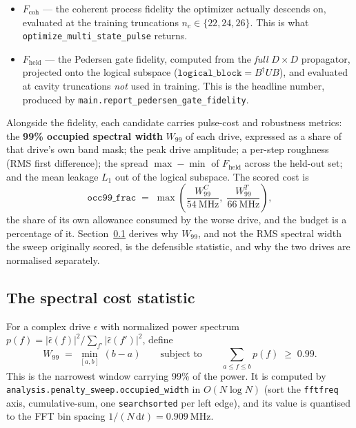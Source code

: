 \documentclass[11pt]{article}
\begin{document}
\begin{itemize}
  \item $F_{\mathrm{coh}}$ --- the coherent process fidelity the optimizer actually descends on,
        evaluated at the training truncations $n_c \in \{22, 24, 26\}$. This is what
        \texttt{optimize\_multi\_state\_pulse} returns.
  \item $F_{\mathrm{held}}$ --- the Pedersen gate fidelity, computed from the \emph{full} $D
        \times D$ propagator, projected onto the logical subspace
        ($\texttt{logical\_block} = B^{\dagger} U B$), and evaluated at cavity truncations
        \emph{not} used in training. This is the headline number, produced by
        \texttt{main.report\_pedersen\_gate\_fidelity}.
\end{itemize}

Alongside the fidelity, each candidate carries pulse-cost and robustness metrics: the
\textbf{99\% occupied spectral width} $W_{99}$ of each drive, expressed as a share of that
drive's own band mask; the peak drive amplitude; a per-step roughness (RMS first difference); the
spread $\max - \min$ of $F_{\mathrm{held}}$ across the held-out set; and the mean leakage $L_1$
out of the logical subspace. The scored cost is
%
\begin{equation}
\label{eq:frac}
\texttt{occ99\_frac} \;=\; \max\!\left(\frac{W_{99}^{C}}{\SI{54}{\mega\hertz}},\;
\frac{W_{99}^{T}}{\SI{66}{\mega\hertz}}\right),
\end{equation}
%
the share of its own allowance consumed by the worse drive, and the budget is a percentage of it.
Section~\ref{sec:width} derives why $W_{99}$, and not the RMS spectral width the sweep originally
scored, is the defensible statistic, and why the two drives are normalised separately.

\subsection{The spectral cost statistic}
\label{sec:width}

For a complex drive $\epsilon$ with normalized power spectrum
$p(f) = |\hat\epsilon(f)|^2 / \sum_{f'} |\hat\epsilon(f')|^2$, define
%
\begin{equation}
\label{eq:w99}
W_{99} \;=\; \min_{[a,b]}\,(b-a)
\qquad \text{subject to} \qquad
\sum_{a \leq f \leq b} p(f) \;\geq\; 0.99 .
\end{equation}
%
This is the narrowest window carrying 99\% of the power. It is computed by
\texttt{analysis.penalty\_sweep.occupied\_width} in $O(N \log N)$ (sort the \texttt{fftfreq} axis,
cumulative-sum, one \texttt{searchsorted} per left edge), and its value is quantised to the FFT
bin spacing $1/(N\,\mathrm{d}t) = \SI{0.909}{\mega\hertz}$.
\end{document}
